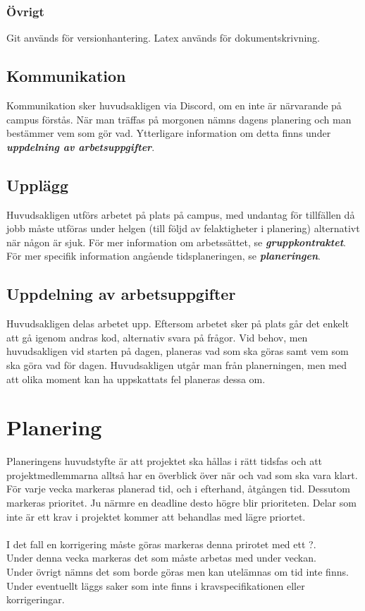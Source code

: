 \documentclass{TDP003mall}
\begin{document}
\subsubsection{Övrigt}
Git används för versionhantering. Latex används för dokumentskrivning. 

\subsection{Kommunikation}
Kommunikation sker huvudsakligen via Discord, om en inte är närvarande på campus förstås. När man träffas på morgonen nämns dagens 
planering och man bestämmer vem som gör vad. Ytterligare information om detta finns under \textbf{\textit{uppdelning av arbetsuppgifter}}.

\subsection{Upplägg}
Huvudsakligen utförs arbetet på plats på campus, med undantag för tillfällen då jobb måste utföras under helgen (till följd av felaktigheter i planering)
alternativt när någon är sjuk. För mer information om arbetssättet, se \textbf{\textit{gruppkontraktet}}. För mer specifik information angående tidsplaneringen, 
se \textbf{\textit{planeringen}}. 

\subsection{Uppdelning av arbetsuppgifter}
Huvudsakligen delas arbetet upp. Eftersom arbetet sker på plats går det enkelt att gå igenom andras kod, alternativ svara på frågor. 
Vid behov, men huvudsakligen vid starten på dagen, planeras vad som ska göras samt vem som ska göra vad för dagen. Huvudsakligen utgår man från
planerningen, men med att olika moment kan ha uppskattats fel planeras dessa om. 

\section{Planering}
Planeringens huvudstyfte är att projektet ska hållas i rätt tidsfas och att projektmedlemmarna alltså har en överblick över när och vad som ska vara klart.
För varje vecka markeras planerad tid, och i efterhand, åtgången tid. Dessutom markeras prioritet. Ju närmre en deadline desto högre blir prioriteten.
Delar som inte är ett krav i projektet kommer att behandlas med lägre priortet.\\\\
I det fall en korrigering måste göras markeras denna prirotet med ett ?. \\
Under denna vecka markeras det som måste arbetas med under veckan.\\
Under övrigt nämns det som borde göras men kan utelämnas om tid inte finns.\\
Under eventuellt läggs saker som inte finns i kravspecifikationen eller korrigeringar. \\
\end{document}
